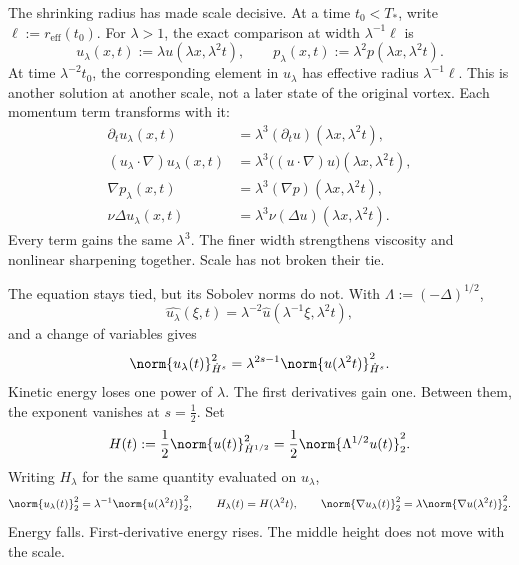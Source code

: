 
The shrinking radius has made scale decisive.
At a time \(t_0<T_*\), write \(\ell:=r_{\mathrm{eff}}(t_0)\).
For \(\lambda>1\), the exact \NavierStokes{} comparison at width \(\lambda^{-1}\ell\) is
\[
  u_\lambda(x,t)
  :=
  \lambda u(\lambda x,\lambda^2t),
  \qquad
  p_\lambda(x,t)
  :=
  \lambda^2p(\lambda x,\lambda^2t).
\]
At time \(\lambda^{-2}t_0\), the corresponding element in \(u_\lambda\) has effective radius \(\lambda^{-1}\ell\).
This is another solution at another scale, not a later state of the original vortex.
Each momentum term transforms with it:
\[
\begin{aligned}
  \partial_tu_\lambda(x,t)
  &=
  \lambda^3(\partial_tu)(\lambda x,\lambda^2t),
  \\
  (u_\lambda\cdot\nabla)u_\lambda(x,t)
  &=
  \lambda^3\bigl((u\cdot\nabla)u\bigr)(\lambda x,\lambda^2t),
  \\
  \nabla p_\lambda(x,t)
  &=
  \lambda^3(\nabla p)(\lambda x,\lambda^2t),
  \\
  \nu\Delta u_\lambda(x,t)
  &=
  \lambda^3\nu(\Delta u)(\lambda x,\lambda^2t).
\end{aligned}
\]
Every term gains the same \(\lambda^3\).
The finer width strengthens viscosity and nonlinear sharpening together.
Scale has not broken their tie.


The equation stays tied, but its Sobolev norms do not.
With \(\Lambda:=(-\Delta)^{1/2}\),
\[
  \widehat{u_\lambda}(\xi,t)
  =
  \lambda^{-2}\widehat u(\lambda^{-1}\xi,\lambda^2t),
\]
and a change of variables gives
\[
  \norm{u_\lambda(t)}_{\dot H^s}^2
  =
  \lambda^{2s-1}
  \norm{u(\lambda^2t)}_{\dot H^s}^2.
\]
Kinetic energy loses one power of \(\lambda\).
The first derivatives gain one.
Between them, the exponent vanishes at \(s=\tfrac12\).
Set
\[
  H(t)
  :=
  \frac12\norm{u(t)}_{\dot H^{1/2}}^2
  =
  \frac12\norm{\Lambda^{1/2}u(t)}_2^2.
\]
Writing \(H_\lambda\) for the same quantity evaluated on \(u_\lambda\),
\[
  \norm{u_\lambda(t)}_2^2
  =
  \lambda^{-1}\norm{u(\lambda^2t)}_2^2,
  \qquad
  H_\lambda(t)=H(\lambda^2t),
  \qquad
  \norm{\nabla u_\lambda(t)}_2^2
  =
  \lambda\norm{\nabla u(\lambda^2t)}_2^2.
\]
Energy falls.
First-derivative energy rises.
The middle height does not move with the scale.


